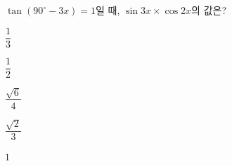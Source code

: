 $\tan(90^\circ-3x)=1$일 때, $\sin 3x\times\cos 2x$의 값은? 
\begin{choices32}{\rule[-3ex]{0pt}{8ex}$\dfrac{1}{3}$}{\rule[-3ex]{0pt}{8ex}$\dfrac{1}{2}$}{\rule[-3ex]{0pt}{8ex}$\dfrac{\sqrt{6}}{4}$}{\rule[-3ex]{0pt}{8ex}$\dfrac{\sqrt{2}}{3}$}{\rule[-3ex]{0pt}{8ex}$1$}\end{choices32}
